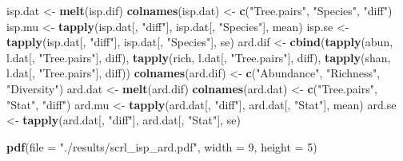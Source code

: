 \documentclass[]{article}
\newenvironment{Shaded}{\begin{snugshade}}{\end{snugshade}}
\newcommand{\KeywordTok}[1]{\textcolor[rgb]{0.13,0.29,0.53}{\textbf{#1}}}
\newcommand{\DataTypeTok}[1]{\textcolor[rgb]{0.13,0.29,0.53}{#1}}
\newcommand{\DecValTok}[1]{\textcolor[rgb]{0.00,0.00,0.81}{#1}}
\newcommand{\StringTok}[1]{\textcolor[rgb]{0.31,0.60,0.02}{#1}}
\newcommand{\NormalTok}[1]{#1}
\begin{document}
\begin{Shaded}
\begin{Highlighting}[]
\NormalTok{isp.dat <-}\StringTok{ }\KeywordTok{melt}\NormalTok{(isp.dif)}
\KeywordTok{colnames}\NormalTok{(isp.dat) <-}\StringTok{ }\KeywordTok{c}\NormalTok{(}\StringTok{"Tree.pairs"}\NormalTok{, }\StringTok{"Species"}\NormalTok{, }\StringTok{"diff"}\NormalTok{)}
\NormalTok{isp.mu <-}\StringTok{ }\KeywordTok{tapply}\NormalTok{(isp.dat[, }\StringTok{"diff"}\NormalTok{], isp.dat[, }\StringTok{"Species"}\NormalTok{], mean)}
\NormalTok{isp.se <-}\StringTok{ }\KeywordTok{tapply}\NormalTok{(isp.dat[, }\StringTok{"diff"}\NormalTok{], isp.dat[, }\StringTok{"Species"}\NormalTok{], se)}
\NormalTok{ard.dif <-}\StringTok{ }\KeywordTok{cbind}\NormalTok{(}\KeywordTok{tapply}\NormalTok{(abun, l.dat[, }\StringTok{"Tree.pairs"}\NormalTok{], diff), }
                 \KeywordTok{tapply}\NormalTok{(rich, l.dat[, }\StringTok{"Tree.pairs"}\NormalTok{], diff), }
                 \KeywordTok{tapply}\NormalTok{(shan, l.dat[, }\StringTok{"Tree.pairs"}\NormalTok{], diff))}
\KeywordTok{colnames}\NormalTok{(ard.dif) <-}\StringTok{ }\KeywordTok{c}\NormalTok{(}\StringTok{"Abundance"}\NormalTok{, }\StringTok{"Richness"}\NormalTok{, }\StringTok{"Diversity"}\NormalTok{)}
\NormalTok{ard.dat <-}\StringTok{ }\KeywordTok{melt}\NormalTok{(ard.dif)}
\KeywordTok{colnames}\NormalTok{(ard.dat) <-}\StringTok{ }\KeywordTok{c}\NormalTok{(}\StringTok{"Tree.pairs"}\NormalTok{, }\StringTok{"Stat"}\NormalTok{, }\StringTok{"diff"}\NormalTok{)}
\NormalTok{ard.mu <-}\StringTok{ }\KeywordTok{tapply}\NormalTok{(ard.dat[, }\StringTok{"diff"}\NormalTok{], ard.dat[, }\StringTok{"Stat"}\NormalTok{], mean)}
\NormalTok{ard.se <-}\StringTok{ }\KeywordTok{tapply}\NormalTok{(ard.dat[, }\StringTok{"diff"}\NormalTok{], ard.dat[, }\StringTok{"Stat"}\NormalTok{], se)}

\KeywordTok{pdf}\NormalTok{(}\DataTypeTok{file =} \StringTok{"./results/scrl_isp_ard.pdf"}\NormalTok{, }\DataTypeTok{width =} \DecValTok{9}\NormalTok{, }\DataTypeTok{height =} \DecValTok{5}\NormalTok{)}


\end{Highlighting}
\end{Shaded}
\end{document}

